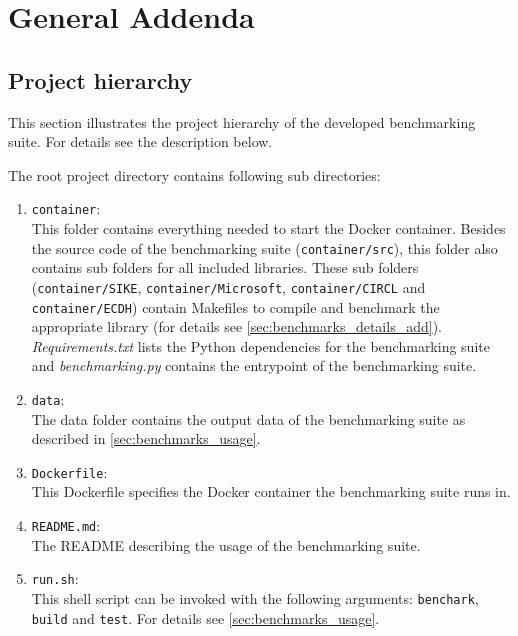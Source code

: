 \chapter{General Addenda}
\section{Project hierarchy}
\label{app:hierarchy}
This section illustrates the project hierarchy of the developed benchmarking suite. For details see the description below.

\newpage
The root project directory contains following sub directories:
\begin{enumerate}
\item \texttt{container}: \\
This folder contains everything needed to start the Docker container. Besides the source code of the benchmarking suite (\texttt{container/src}), this folder also contains sub folders for all included libraries. These sub folders (\texttt{container/SIKE}, \texttt{container/Microsoft}, \texttt{container/CIRCL} and \texttt{container/ECDH}) contain Makefiles to compile and benchmark the appropriate library (for details see \autoref{sec:benchmarks_details_add}).\\
\textit{Requirements.txt} lists the Python dependencies for the benchmarking suite and \textit{benchmarking.py} contains the entrypoint of the benchmarking suite.
\item \texttt{data}:\\
The data folder contains the output data of the benchmarking suite as described in \autoref{sec:benchmarks_usage}.
\item \texttt{Dockerfile}:\\
This Dockerfile specifies the Docker container the benchmarking suite runs in.
\item \texttt{README.md}:\\
The README describing the usage of the benchmarking suite.
\item \texttt{run.sh}:\\
This shell script can be invoked with the following arguments: \texttt{benchark}, \texttt{build} and \texttt{test}. For details see \autoref{sec:benchmarks_usage}.
\end{enumerate}


